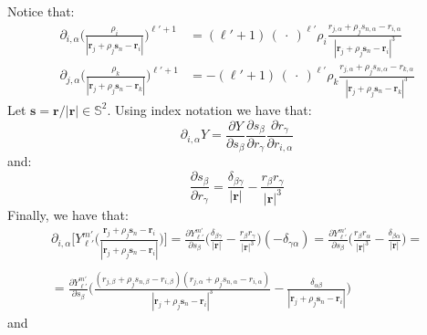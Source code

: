 \documentclass[12pt,letterpaper,oneside]{article}
\theoremstyle{definition}
\begin{document}
Notice that:
\begin{align*}
\partial_{i,\alpha} \bigg( \frac{\rho_i}{| \boldsymbol{r}_j + \rho_j \boldsymbol{s}_n - \boldsymbol{r}_i |} \bigg)^{\ell'+1} & =  (\ell'+1) \, (\: \cdot \: )^{\ell'} \rho_i \frac{ r_{j,\alpha} + \rho_j s_{n,\alpha} - r_{i,\alpha}}{| \boldsymbol{r}_j + \rho_j \boldsymbol{s}_n - \boldsymbol{r}_i |^3}  \\
\partial_{j,\alpha} \bigg( \frac{\rho_k}{| \boldsymbol{r}_j + \rho_j \boldsymbol{s}_n - \boldsymbol{r}_k |} \bigg)^{\ell'+1} & =  - (\ell'+1) \, (\: \cdot \: )^{\ell'} \rho_k \frac{ r_{j,\alpha} + \rho_j s_{n,\alpha} - r_{k,\alpha}}{| \boldsymbol{r}_j + \rho_j \boldsymbol{s}_n - \boldsymbol{r}_k |^3}
\end{align*}
Let $\boldsymbol{s} = \boldsymbol{r} / |\boldsymbol{r}| \in \mathbb{S}^2$. Using index notation we have that:
\[
\partial_{i,\alpha} Y= \frac{\partial Y}{\partial s_\beta} \frac{\partial s_\beta}{\partial r_{\gamma}} \frac{\partial r_\gamma}{\partial r_{i,\alpha}}
\]
and:
\[
\frac{\partial s_\beta}{ \partial r_\gamma} = \frac{\delta_{\beta \gamma}}{|\boldsymbol{r}|} - \frac{r_\beta r_\gamma}{|\boldsymbol{r}|^3}
\]
Finally, we have that:
\begin{multline*}
\partial_{i,\alpha} \bigg[ Y_{\ell'}^{m'} \bigg( \frac{\boldsymbol{r}_j + \rho_j \boldsymbol{s}_n - \boldsymbol{r}_i}{| \boldsymbol{r}_j + \rho_j \boldsymbol{s}_n - \boldsymbol{r}_i |} \bigg) \bigg] = \frac{\partial Y_{\ell'}^{m'} }{\partial s_\beta} \bigg( \frac{\delta_{\beta \gamma}}{|\boldsymbol{r}|} - \frac{r_\beta r_\gamma}{|\boldsymbol{r}|^3} \bigg)(-\delta_{\gamma \alpha}) 
= \frac{\partial Y_{\ell'}^{m'} }{\partial s_\beta} \bigg( \frac{r_\beta r_\alpha}{|\boldsymbol{r}|^3} -\frac{\delta_{\beta \alpha}}{|\boldsymbol{r}|} \bigg) = \\ \\ =
\frac{\partial Y_{\ell'}^{m'} }{\partial s_\beta} \bigg( \frac{({r}_{j,\beta} + \rho_j {s}_{n,\beta} - {r}_{i,\beta})({r}_{j,\alpha} + \rho_j {s}_{n,\alpha} - {r}_{i,\alpha})}{| \boldsymbol{r}_j + \rho_j \boldsymbol{s}_n - \boldsymbol{r}_i |^3}  -\frac{\delta_{\alpha\beta}}{| \boldsymbol{r}_j + \rho_j \boldsymbol{s}_n - \boldsymbol{r}_i |}\bigg)
\end{multline*}
and
\end{document}
